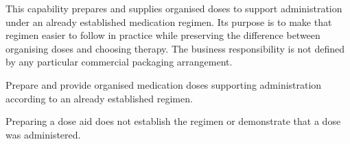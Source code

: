 This capability prepares and supplies organised doses to support administration under an already established medication regimen. Its purpose is to make that regimen easier to follow in practice while preserving the difference between organising doses and choosing therapy. The business responsibility is not defined by any particular commercial packaging arrangement.



Prepare and provide organised medication doses supporting administration according to an already established regimen.



Preparing a dose aid does not establish the regimen or demonstrate that a dose was administered.


